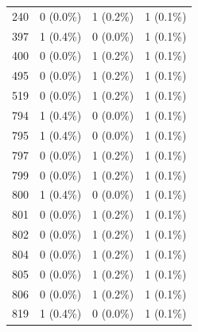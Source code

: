 \documentclass{article}
\begin{document}
\begin{table}[hbt!]
{\begin{tabular}{cccc}
240                                       & 0 (0.0\%)       & 1 (0.2\%)          & 1 (0.1\%)       \\
397                                       & 1 (0.4\%)       & 0 (0.0\%)          & 1 (0.1\%)       \\
400                                       & 0 (0.0\%)       & 1 (0.2\%)          & 1 (0.1\%)       \\
495                                       & 0 (0.0\%)       & 1 (0.2\%)          & 1 (0.1\%)       \\
519                                       & 0 (0.0\%)       & 1 (0.2\%)          & 1 (0.1\%)       \\
794                                       & 1 (0.4\%)       & 0 (0.0\%)          & 1 (0.1\%)       \\
795                                       & 1 (0.4\%)       & 0 (0.0\%)          & 1 (0.1\%)       \\
797                                       & 0 (0.0\%)       & 1 (0.2\%)          & 1 (0.1\%)       \\
799                                       & 0 (0.0\%)       & 1 (0.2\%)          & 1 (0.1\%)       \\
800                                       & 1 (0.4\%)       & 0 (0.0\%)          & 1 (0.1\%)       \\
801                                       & 0 (0.0\%)       & 1 (0.2\%)          & 1 (0.1\%)       \\
802                                       & 0 (0.0\%)       & 1 (0.2\%)          & 1 (0.1\%)       \\
804                                       & 0 (0.0\%)       & 1 (0.2\%)          & 1 (0.1\%)       \\
805                                       & 0 (0.0\%)       & 1 (0.2\%)          & 1 (0.1\%)       \\
806                                       & 0 (0.0\%)       & 1 (0.2\%)          & 1 (0.1\%)       \\
819                                       & 1 (0.4\%)       & 0 (0.0\%)          & 1 (0.1\%)      
\end{tabular}%
}
\end{table}
\newpage
\FloatBarrier
\printbibliography
\end{document}
